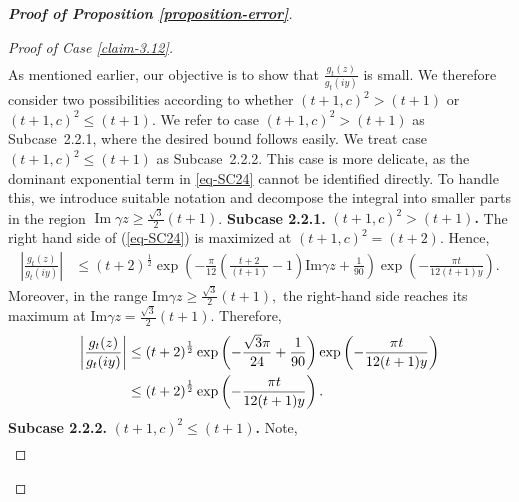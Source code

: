 \documentclass[11pt]{amsart}
\theoremstyle{plain}
\renewcommand{\Im}{\operatorname{Im}}
\numberwithin{equation}{section}
\begin{document}
\begin{proof}[\textbf{\boldmath Proof of Proposition \ref{proposition-error}}]
\begin{proof}[Proof of Case \ref{claim-3.12}]
\begin{align}
			\end{align}
			As mentioned earlier, our objective is to show that $\frac{g_t(z)}{g_t(iy)}$ is small. We therefore consider two possibilities according to whether $(t+1,c)^2 > (t+1)$ or $(t+1,c)^2 \le (t+1)$. 
			We refer to case $(t+1,c)^2 > (t+1)$ as Subcase~2.2.1, where the desired bound follows easily. We treat case $(t+1,c)^2 \le (t+1)$ as Subcase~2.2.2. This case is more delicate, as the dominant exponential term 
			in \eqref{eq-SC24} cannot be identified directly.
			To handle this, we introduce suitable notation and decompose the integral into smaller parts in the region $\Im \gamma z \ge \frac{\sqrt{3}}{2}(t+1)$.
			\newline
			\noindent\textbf{Subcase 2.2.1.} \textbf{\boldmath $(t+1,c)^{2} > (t+1)$.} 
			\newline
			The right hand side of (\ref{eq-SC24}) is maximized at $(t+1,c)^2=(t+2)$. Hence,
			\begin{align*}
				\left|\frac{g_{t}(z)}{g_t(iy)}\right|&\le (t+2)^{\frac{1}{2}}\exp\left(-\frac{\pi}{12}\left(\frac{t+2}{(t+1)}-1\right)\text{Im}\gamma z+\frac{1}{90}\right)\exp\left(-\frac{\pi t}{12(t+1)y}\right).
			\end{align*}
			Moreover, in the range $\text{Im}\gamma z\ge \frac{\sqrt{3}}{2}(t+1),$ the right-hand side reaches its maximum at  $\text{Im}\gamma z= \frac{\sqrt{3}}{2}(t+1)$. Therefore,
			\begin{align}\label{eq-SC211}
				\notag
				\left|\frac{g_{t}(z)}{g_t(iy)}\right|  &\le \left(t+2\right)^{\frac{1}{2}}\exp\left(-\frac{\sqrt{3}\pi }{24}+\frac{1}{90}\right)\exp\left(-\frac{\pi t}{12(t+1)y}\right)\\
				&\le \left(t+2\right)^{\frac{1}{2}}\exp\left(-\frac{\pi t}{12(t+1)y}\right).
			\end{align}
			\noindent\textbf{Subcase 2.2.2.} \textbf{\boldmath $(t+1,c)^{2} \le (t+1)$.} 
			\newline
			Note,
			\begin{align*}

\end{align*}
\end{proof}
\end{proof}
\end{document}
